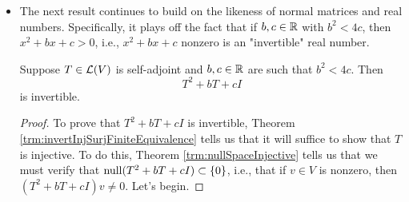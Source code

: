 \documentclass[../main.tex]{subfiles}
\begin{document}
\begin{itemize}
\begin{theorem}
\begin{proof}
            Suppose first that (c) holds. Since $\mat{T}$ is diagonal and $\mat{T^*}$ is the conjugate transpose of $\mat{T}$, $\mat{T^*}$ is diagonal. Therefore, since any two diagonal matrices commute, $T$ is normal, so (a) holds.\par
            Now suppose that (a) holds. By \hyperref[trm:Schur]{Schur's Theorem}, there exists an orthonormal basis $e_1,\dots,e_n$ of $V$ with respect to which $T$ has an upper triangular matrix. We will show that this matrix is actually diagonal. To begin, since $\mat{T}$ is upper triangular, we know that
            \begin{equation*}
                \norm{Te_1}^2 = |a_{1,1}|^2
            \end{equation*}
            Similarly, since $T^*$ is the conjugate \emph{transpose}, we have that
            \begin{equation*}
                \norm{T^*e_1}^2 = |a_{1,1}|^2+\cdots+|a_{1,n}|^2
            \end{equation*}
            But since $\norm{Te_1}=\norm{T^*e_1}$ by Theorem \ref{trm:normalNorm}, the two equations above imply that
            \begin{equation*}
                0 = |a_{1,2}|^2+\cdots+|a_{1,n}|^2
            \end{equation*}
            Therefore, we know that all entries in row 1 save the first are zero. We may repeat this procedure for every row to finish the proof.
        \end{proof}
    \end{theorem}
    \item The next result continues to build on the likeness of normal matrices and real numbers. Specifically, it plays off the fact that if $b,c\in\mathbb{R}$ with $b^2<4c$, then $x^2+bx+c>0$, i.e., $x^2+bx+c$ nonzero is an "invertible" real number.
    \begin{theorem}\label{trm:invertibleQuadratics}
        Suppose $T\in\mathcal{L}(V)$ is self-adjoint and $b,c\in\mathbb{R}$ are such that $b^2<4c$. Then
        \begin{equation*}
            T^2+bT+cI
        \end{equation*}
        is invertible.
        \begin{proof}
            To prove that $T^2+bT+cI$ is invertible, Theorem \ref{trm:invertInjSurjFiniteEquivalence} tells us that it will suffice to show that $T$ is injective. To do this, Theorem \ref{trm:nullSpaceInjective} tells us that we must verify that $\operatorname{null}(T^2+bT+cI)\subset\{0\}$, i.e., that if $v\in V$ is nonzero, then $(T^2+bT+cI)v\neq 0$. Let's begin.\par

\end{proof}
\end{theorem}
\end{itemize}
\end{document}
